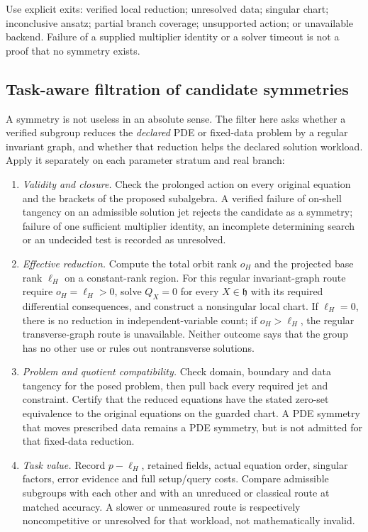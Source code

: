 \documentclass[11pt]{article}
\theoremstyle{definition}
\begin{document}
Use explicit exits: verified local reduction; unresolved data; singular
chart; inconclusive ansatz; partial branch coverage; unsupported action;
or unavailable backend. Failure of a supplied
multiplier identity or a solver timeout is not a proof that no symmetry exists.

\subsection{Task-aware filtration of candidate symmetries}
\label{sec:task-filter-core}
A symmetry is not useless in an absolute sense. The filter here asks whether a
verified subgroup reduces the \emph{declared} PDE or fixed-data problem by a
regular invariant graph, and whether that reduction helps the declared solution
workload. Apply it separately on each parameter stratum and real branch:
\begin{enumerate}
\item \emph{Validity and closure.} Check the prolonged action on every original
equation and the brackets of the proposed subalgebra. A verified failure of
on-shell tangency on an admissible solution jet rejects the candidate as a
symmetry; failure of one sufficient multiplier identity, an incomplete
determining search or an undecided test is recorded as unresolved.
\item \emph{Effective reduction.} Compute the total orbit rank $o_H$ and the
projected base rank $\ell_H$ on a constant-rank region. For this regular
invariant-graph route require $o_H=\ell_H>0$, solve $Q_X=0$ for every
$X\in\mathfrak h$ with its required differential consequences, and construct
a nonsingular local chart. If $\ell_H=0$,
there is no reduction in independent-variable count; if $o_H>\ell_H$, the
regular transverse-graph route is unavailable. Neither outcome says that the
group has no other use or rules out nontransverse solutions.
\item \emph{Problem and quotient compatibility.} Check domain, boundary and
data tangency for the posed problem, then pull back every required jet and
constraint. Certify that the reduced equations have the stated zero-set
equivalence to the original equations on the guarded chart. A PDE symmetry
that moves prescribed data remains a PDE symmetry, but is not admitted for
that fixed-data reduction.
\item \emph{Task value.} Record $p-\ell_H$, retained fields, actual equation
order, singular factors, error evidence and full setup/query costs. Compare
admissible subgroups with each other and with an unreduced or classical route
at matched accuracy. A slower or unmeasured route is respectively
noncompetitive or unresolved for that workload, not mathematically invalid.
\end{enumerate}
\end{document}
